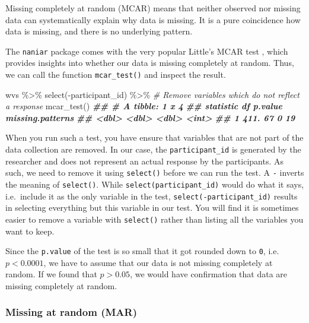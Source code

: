 \documentclass[
]{book}
\newenvironment{Shaded}{\begin{snugshade}}{\end{snugshade}}
\newcommand{\CommentTok}[1]{\textcolor[rgb]{0.56,0.35,0.01}{\textit{#1}}}
\newcommand{\DocumentationTok}[1]{\textcolor[rgb]{0.56,0.35,0.01}{\textbf{\textit{#1}}}}
\newcommand{\FunctionTok}[1]{\textcolor[rgb]{0.00,0.00,0.00}{#1}}
\newcommand{\NormalTok}[1]{#1}
\newcommand{\SpecialCharTok}[1]{\textcolor[rgb]{0.00,0.00,0.00}{#1}}
\begin{document}
Missing completely at random (MCAR) means that neither observed nor missing data can systematically explain why data is missing. It is a pure coincidence how data is missing, and there is no underlying pattern.

The \texttt{naniar} package comes with the very popular Little's MCAR test \citep{little-1988}, which provides insights into whether our data is missing completely at random. Thus, we can call the function \texttt{mcar\_test()} and inspect the result.

\begin{Shaded}
\begin{Highlighting}[]
\NormalTok{wvs }\SpecialCharTok{\%\textgreater{}\%}
  \FunctionTok{select}\NormalTok{(}\SpecialCharTok{{-}}\NormalTok{participant\_id) }\SpecialCharTok{\%\textgreater{}\%}     \CommentTok{\# Remove variables which do not reflect a response}
  \FunctionTok{mcar\_test}\NormalTok{()}
\DocumentationTok{\#\# \# A tibble: 1 x 4}
\DocumentationTok{\#\#   statistic    df p.value missing.patterns}
\DocumentationTok{\#\#       \textless{}dbl\textgreater{} \textless{}dbl\textgreater{}   \textless{}dbl\textgreater{}            \textless{}int\textgreater{}}
\DocumentationTok{\#\# 1      411.    67       0               19}
\end{Highlighting}
\end{Shaded}

When you run such a test, you have ensure that variables that are not part of the data collection are removed. In our case, the \texttt{participant\_id} is generated by the researcher and does not represent an actual response by the participants. As such, we need to remove it using \texttt{select()} before we can run the test. A \texttt{-} inverts the meaning of \texttt{select()}. While \texttt{select(participant\_id)} would do what it says, i.e.~include it as the only variable in the test, \texttt{select(-participant\_id)} results in selecting everything but this variable in our test. You will find it is sometimes easier to remove a variable with \texttt{select()} rather than listing all the variables you want to keep.

Since the \texttt{p.value} of the test is so small that it got rounded down to \texttt{0}, i.e.~\(p<0.0001\), we have to assume that our data is not missing completely at random. If we found that \(p>0.05\), we would have confirmation that data are missing completely at random.

\hypertarget{missing-at-random-mar}{%
\subsubsection{Missing at random (MAR)}\label{missing-at-random-mar}}
\end{document}
